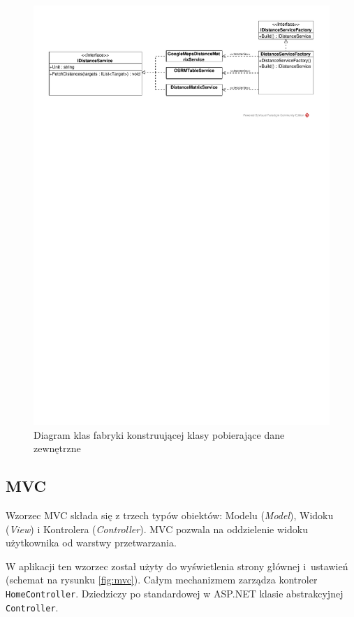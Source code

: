 \begin{figure}[htbp]
	\centering
	\includegraphics[clip, trim=1cm 23cm 1cm 1cm, width=1.00\textwidth]{uml/fabryka.pdf}
	\caption{Diagram klas fabryki konstruującej klasy pobierające dane zewnętrzne}
	\label{fig:fabryka}
\end{figure}

\subsection*{MVC}
Wzorzec MVC składa się z trzech typów obiektów: Modelu (\textit{Model}), Widoku (\textit{View}) i Kontrolera (\textit{Controller}). MVC pozwala na oddzielenie widoku użytkownika od warstwy przetwarzania. 

W aplikacji ten wzorzec został użyty do wyświetlenia strony głównej i~ustawień (schemat na rysunku \ref{fig:mvc}). Całym mechanizmem zarządza kontroler \texttt{HomeController}. Dziedziczy po standardowej w ASP.NET klasie abstrakcyjnej \texttt{Controller}.

